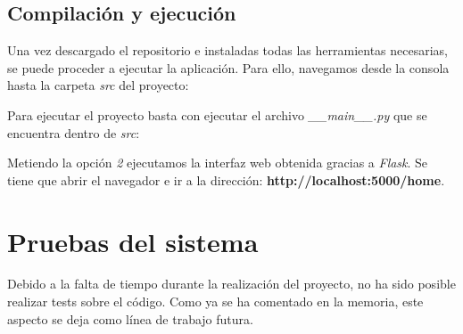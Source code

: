 \subsection{Compilación y ejecución}
Una vez descargado el repositorio e instaladas todas las herramientas necesarias, se puede proceder a ejecutar la aplicación. Para ello, navegamos desde la consola hasta la carpeta \textit{src} del proyecto:


Para ejecutar el proyecto basta con ejecutar el archivo \textit{\_\_main\_\_.py} que se encuentra dentro de \textit{src}:


Metiendo la opción \textit{2} ejecutamos la interfaz web obtenida gracias a \textit{Flask}. Se tiene que abrir el navegador e ir a la dirección: \textbf{http://localhost:5000/home}.


\section{Pruebas del sistema}
Debido a la falta de tiempo durante la realización del proyecto, no ha sido posible realizar tests sobre el código. Como ya se ha comentado en la memoria, este aspecto se deja como línea de trabajo futura.